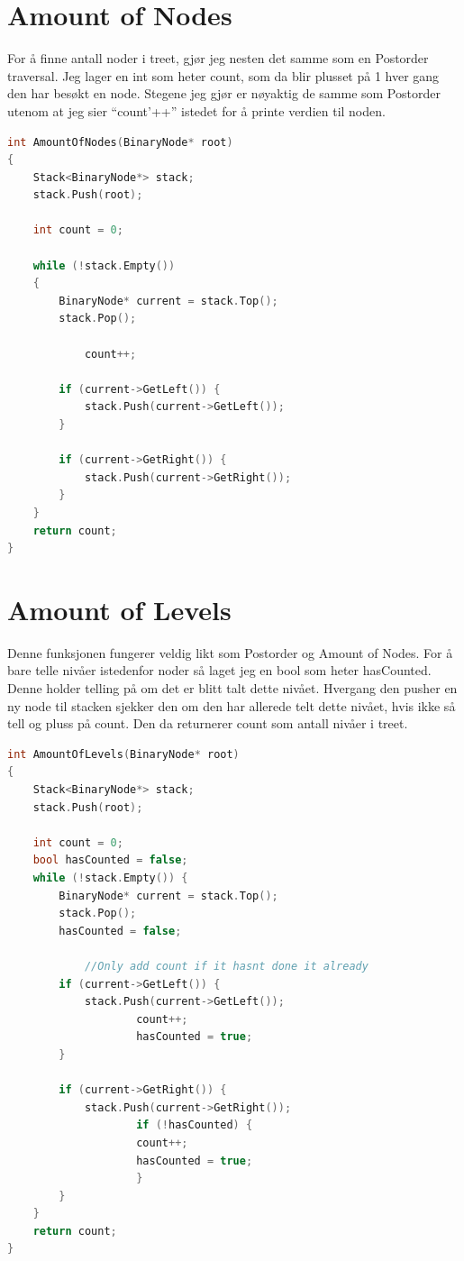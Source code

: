 \documentclass[a4paper,norsk]{article}
\begin{document}
\section{Amount of Nodes}
For å finne antall noder i treet, gjør jeg nesten det samme som en Postorder traversal. 
Jeg lager en int som heter count, som da blir plusset på 1 hver gang den har besøkt en node. 
Stegene jeg gjør er nøyaktig de samme som Postorder utenom at jeg sier ``count'++'' istedet for å printe verdien til noden.
\begin{lstlisting}[language=C++, caption={Oblig2.cpp}]
int AmountOfNodes(BinaryNode* root)
{
	Stack<BinaryNode*> stack;
	stack.Push(root);

    int count = 0;

    while (!stack.Empty()) 
    {
		BinaryNode* current = stack.Top();
		stack.Pop();
        
        	count++;

		if (current->GetLeft()) {
			stack.Push(current->GetLeft());
		}

		if (current->GetRight()) {
			stack.Push(current->GetRight());
		}
    }
    return count;
}
\end{lstlisting}
\section{Amount of Levels}
Denne funksjonen fungerer veldig likt som Postorder og Amount of Nodes.
For å bare telle nivåer istedenfor noder så laget jeg en bool som heter hasCounted. Denne holder telling på om det er blitt talt dette nivået. 
Hvergang den pusher en ny node til stacken sjekker den om den har allerede telt dette nivået, hvis ikke så tell og pluss på count. 
Den da returnerer count som antall nivåer i treet.
\begin{lstlisting}[language=C++, caption={Oblig2.cpp}]
int AmountOfLevels(BinaryNode* root)
{
	Stack<BinaryNode*> stack;
	stack.Push(root);

	int count = 0;
	bool hasCounted = false;
	while (!stack.Empty()) {
		BinaryNode* current = stack.Top();
		stack.Pop();
       	hasCounted = false;
		
        	//Only add count if it hasnt done it already
		if (current->GetLeft()) {
			stack.Push(current->GetLeft());
            		count++;
            		hasCounted = true;
		}

		if (current->GetRight()) {
			stack.Push(current->GetRight());
            		if (!hasCounted) {
                	count++;
                	hasCounted = true;
            		}
		}
	}
    return count;
}
\end{lstlisting}
\end{document}
